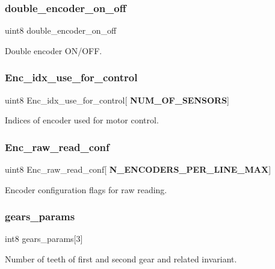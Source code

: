 \subsubsection{double\+\_\+encoder\+\_\+on\+\_\+off}
{\footnotesize\ttfamily uint8 double\+\_\+encoder\+\_\+on\+\_\+off}

Double encoder O\+N/\+O\+FF. \mbox{\label{structst__encoder_a300729112e37ceb3cddb32fa494d3465}} 
\subsubsection{Enc\+\_\+idx\+\_\+use\+\_\+for\+\_\+control}
{\footnotesize\ttfamily uint8 Enc\+\_\+idx\+\_\+use\+\_\+for\+\_\+control[\textbf{ N\+U\+M\+\_\+\+O\+F\+\_\+\+S\+E\+N\+S\+O\+RS}]}

Indices of encoder used for motor control. \mbox{\label{structst__encoder_a2542097cdf0fa6d56f5636fddf0f1d61}} 
\subsubsection{Enc\+\_\+raw\+\_\+read\+\_\+conf}
{\footnotesize\ttfamily uint8 Enc\+\_\+raw\+\_\+read\+\_\+conf[\textbf{ N\+\_\+\+E\+N\+C\+O\+D\+E\+R\+S\+\_\+\+P\+E\+R\+\_\+\+L\+I\+N\+E\+\_\+\+M\+AX}]}

Encoder configuration flags for raw reading. \mbox{\label{structst__encoder_ae23966f44fc93a65dd541ea5378c8d10}} 
\subsubsection{gears\+\_\+params}
{\footnotesize\ttfamily int8 gears\+\_\+params[3]}

Number of teeth of first and second gear and related invariant. \mbox{\label{structst__encoder_a72a3f4edd175c9d8981a2595bcde938c}} 

